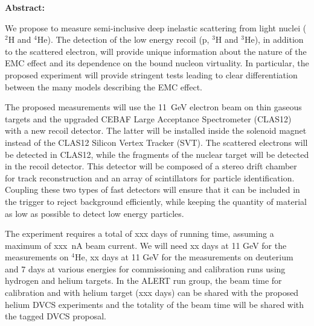 {\large\textbf{Abstract:}}

We propose to measure semi-inclusive deep inelastic scattering from light nuclei ($^2$H and $^4$He). The detection of the low energy recoil (p, $^3$H and $^3$He), in addition to the scattered electron, will provide unique information about the nature of the EMC effect and its dependence on the bound nucleon virtuality. In particular, the proposed experiment will provide stringent tests leading to clear differentiation between the many models describing the EMC effect.

The proposed measurements will use the 11~GeV electron beam on thin gaseous targets and the upgraded CEBAF Large Acceptance Spectrometer (CLAS12) with a new recoil detector. The latter will be installed inside the solenoid magnet instead of the CLAS12 Silicon Vertex Tracker (SVT). The scattered electrons will be detected in CLAS12, while the fragments of the nuclear target will be detected in the recoil detector. 
This detector will be composed of a stereo drift chamber for track reconstruction and an array 
of scintillators for particle identification. Coupling these two types of fast detectors will 
ensure that it can be included in the trigger to reject background efficiently, while keeping 
the quantity of material as low as possible to detect low energy particles.

The experiment requires a total of xxx days of running time, assuming a maximum of xxx~nA beam current. We will need xx days at 11 GeV for the measurements on $^4$He, xx days at 11 GeV for the measurements on deuterium and 7 days at various energies for commissioning and calibration runs using hydrogen and helium targets. In the ALERT run group, the beam time for calibration and with helium target (xxx days) can be shared with the proposed helium DVCS experiments and the totality of the beam time will be shared with the tagged DVCS proposal.


\newpage

